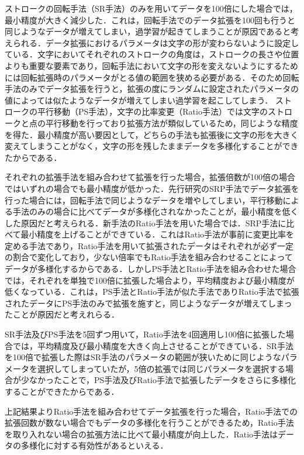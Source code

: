 ストロークの回転手法（SR手法）のみを用いてデータを100倍にした場合では，最小精度が大きく減少した．これは，回転手法でのデータ拡張を100回も行うと同じようなデータが増えてしまい，過学習が起きてしまうことが原因であると考えられる．データ拡張におけるパラメータは文字の形が変わらないように設定している．文字においてそれぞれのストロークの角度は，ストロークの長さや位置よりも重要な要素であり，回転手法において文字の形を変えないようにするためには回転拡張時のパラメータがとる値の範囲を狭める必要がある．そのため回転手法のみでデータ拡張を行うと，拡張の度にランダムに設定されたパラメータの値によっては似たようなデータが増えてしまい過学習を起こしてしまう．
ストロークの平行移動（PS手法），文字の比率変更（Ratio手法）では文字のストロークと点の平行移動を行っており拡張方法が類似しているため，同じような精度を得た．最小精度が高い要因として，どちらの手法も拡張後に文字の形を大きく変えてしまうことがなく，文字の形を残したままデータを多様化することができたからである．

それぞれの拡張手法を組み合わせて拡張を行った場合，拡張倍数が100倍の場合ではいずれの場合でも最小精度が低かった．先行研究\cite{takahashi}のSRP手法でデータ拡張を行った場合には，回転手法で同じようなデータを増やしてしまい，平行移動による手法のみの場合に比べてデータが多様化されなかったことが，最小精度を低くした原因だと考えられる．新手法のRatio手法を用いた場合では．SRP手法に比べて最小精度を上げることができている．これはRatio手法が事前に変更比率を定める手法であり，Ratio手法を用いて拡張されたデータはそれぞれが必ず一定の割合で変化しており，少ない倍率でもRatio手法を組み合わせることによってデータが多様化するからである．しかしPS手法とRatio手法を組み合わせた場合では，それぞれを単独で100倍に拡張した場合より，平均精度および最小精度が低くなっている．これは，PS手法とRatio手法が似た手法でありRatio手法で拡張されたデータにPS手法のみで拡張を施すと，同じようなデータが増えてしまったことが原因だと考えれらる．

SR手法及びPS手法を5回ずつ用いて，Ratio手法を4回適用し100倍に拡張した場合では，平均精度及び最小精度を大きく向上させることができている．SR手法を100倍で拡張した際はSR手法のパラメータの範囲が狭いために同じようなパラメータを選択してしまっていたが，5倍の拡張では同じパラメータを選択する場合が少なかったことで，PS手法及びRatio手法で拡張したデータをさらに多様化することができたからである．

上記結果よりRatio手法を組み合わせてデータ拡張を行った場合，Ratio手法での拡張回数が数ない場合でもデータの多様化を行うことができるため，Ratio手法を取り入れない場合の拡張方法に比べて最小精度が向上した．Ratio手法はデータの多様化に対する有効性があるといえる．
 
